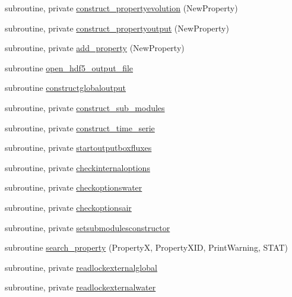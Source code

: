 \begin{DoxyCompactItemize}
subroutine, private \mbox{\hyperlink{namespacemoduleinterfacewaterair_a49127aa503109a2b4f86aee6e0d4d665}{construct\+\_\+propertyevolution}} (New\+Property)
\item 
subroutine, private \mbox{\hyperlink{namespacemoduleinterfacewaterair_aa99a2e7fefb8e45ed29092e8c068982a}{construct\+\_\+propertyoutput}} (New\+Property)
\item 
subroutine, private \mbox{\hyperlink{namespacemoduleinterfacewaterair_a2a801625d49cd1732858f2dc52a71271}{add\+\_\+property}} (New\+Property)
\item 
subroutine \mbox{\hyperlink{namespacemoduleinterfacewaterair_a48080272c5d72deaf3fe655740d02ccc}{open\+\_\+hdf5\+\_\+output\+\_\+file}}
\item 
subroutine \mbox{\hyperlink{namespacemoduleinterfacewaterair_a1512570388fa7585da06c4fd36fc27ae}{constructglobaloutput}}
\item 
subroutine, private \mbox{\hyperlink{namespacemoduleinterfacewaterair_a26e91289c0b811bff694b61c7a06fb15}{construct\+\_\+sub\+\_\+modules}}
\item 
subroutine, private \mbox{\hyperlink{namespacemoduleinterfacewaterair_a49e85ee8a7b283a5ec88a2c8db419d3e}{construct\+\_\+time\+\_\+serie}}
\item 
subroutine, private \mbox{\hyperlink{namespacemoduleinterfacewaterair_a657983e875ad047622b576288b98dd2e}{startoutputboxfluxes}}
\item 
subroutine, private \mbox{\hyperlink{namespacemoduleinterfacewaterair_a7bb7aa6672e098e262e702265ea4cbef}{checkinternaloptions}}
\item 
subroutine, private \mbox{\hyperlink{namespacemoduleinterfacewaterair_a6ca031d04555d7ec7193b26144ed978f}{checkoptionswater}}
\item 
subroutine, private \mbox{\hyperlink{namespacemoduleinterfacewaterair_afa8defb4c07e4d9150f1507fc3ea475a}{checkoptionsair}}
\item 
subroutine, private \mbox{\hyperlink{namespacemoduleinterfacewaterair_acc8f2f52f650494e800b421332c39060}{setsubmodulesconstructor}}
\item 
subroutine \mbox{\hyperlink{namespacemoduleinterfacewaterair_abba77353f44ae39342d577e54d38ad95}{search\+\_\+property}} (PropertyX, Property\+X\+ID, Print\+Warning, S\+T\+AT)
\item 
subroutine, private \mbox{\hyperlink{namespacemoduleinterfacewaterair_a859b7054113f5f1ab347adbd693c2e16}{readlockexternalglobal}}
\item 
subroutine, private \mbox{\hyperlink{namespacemoduleinterfacewaterair_a78276c71fe608663c6c964c59c8c7626}{readlockexternalwater}}

\end{DoxyCompactItemize}
